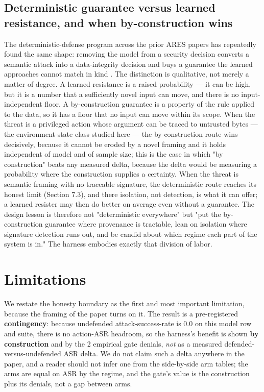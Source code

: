 \documentclass[sigconf,anonymous,review]{acmart}
\begin{document}
\subsection{Deterministic guarantee versus learned resistance, and when by-construction wins}
The deterministic-defense program across the prior ARES papers has repeatedly found the same shape: removing the model from a security decision converts a semantic attack into a data-integrity decision and buys a guarantee the learned approaches cannot match in kind \citep{gmys-casiano-2026a, gmys-casiano-2026d}. The distinction is qualitative, not merely a matter of degree. A learned resistance is a raised probability --- it can be high, but it is a number that a sufficiently novel input can move, and there is no input-independent floor. A by-construction guarantee is a property of the rule applied to the data, so it has a floor that no input can move within its scope. When the threat is a privileged action whose argument can be traced to untrusted bytes --- the environment-state class studied here --- the by-construction route wins decisively, because it cannot be eroded by a novel framing and it holds independent of model and of sample size; this is the case in which "by construction" beats any measured delta, because the delta would be measuring a probability where the construction supplies a certainty. When the threat is semantic framing with no traceable signature, the deterministic route reaches its honest limit (Section 7.3), and there isolation, not detection, is what it can offer; a learned resister may then do better on average even without a guarantee. The design lesson is therefore not "deterministic everywhere" but "put the by-construction guarantee where provenance is tractable, lean on isolation where signature detection runs out, and be candid about which regime each part of the system is in." The harness embodies exactly that division of labor.


\section{Limitations}
We restate the honesty boundary as the first and most important limitation, because the framing of the paper turns on it. The result is a pre-registered \textbf{contingency}: because undefended attack-success-rate is 0.0 on this model row and suite, there is no action-ASR headroom, so the harness's benefit is shown \textbf{by construction} and by the 2 empirical gate denials, \textit{not} as a measured defended-versus-undefended ASR delta. We do not claim such a delta anywhere in the paper, and a reader should not infer one from the side-by-side arm tables; the arms are equal on ASR by the regime, and the gate's value is the construction plus its denials, not a gap between arms.
\end{document}
